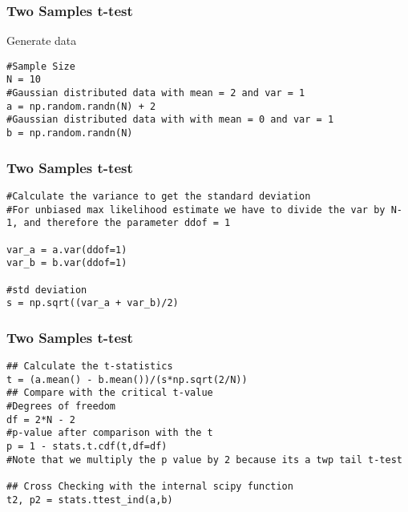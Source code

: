 \begin{frame}[fragile]\frametitle{Two Samples t-test}
Generate data
\begin{lstlisting}
#Sample Size
N = 10
#Gaussian distributed data with mean = 2 and var = 1
a = np.random.randn(N) + 2
#Gaussian distributed data with with mean = 0 and var = 1
b = np.random.randn(N)
\end{lstlisting}
\end{frame}


\begin{frame}[fragile]\frametitle{Two Samples t-test}
\begin{lstlisting}
#Calculate the variance to get the standard deviation
#For unbiased max likelihood estimate we have to divide the var by N-1, and therefore the parameter ddof = 1

var_a = a.var(ddof=1)
var_b = b.var(ddof=1)

#std deviation
s = np.sqrt((var_a + var_b)/2)
\end{lstlisting}
\end{frame}


\begin{frame}[fragile]\frametitle{Two Samples t-test}
\begin{lstlisting}
## Calculate the t-statistics
t = (a.mean() - b.mean())/(s*np.sqrt(2/N))
## Compare with the critical t-value
#Degrees of freedom
df = 2*N - 2
#p-value after comparison with the t 
p = 1 - stats.t.cdf(t,df=df)
#Note that we multiply the p value by 2 because its a twp tail t-test

## Cross Checking with the internal scipy function
t2, p2 = stats.ttest_ind(a,b)
\end{lstlisting}
\end{frame} 


